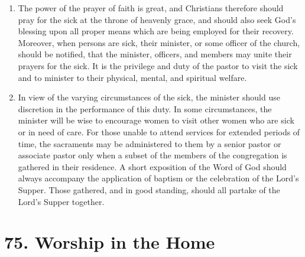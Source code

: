 \documentclass[
]{book}
\providecommand{\tightlist}{%
  \setlength{\itemsep}{0pt}\setlength{\parskip}{0pt}}
\begin{document}
\begin{enumerate}
\def\labelenumi{\arabic{enumi}.}
\tightlist
\item
  \protect\hypertarget{74}{\href{}{}}The power of the prayer of faith is great, and Christians therefore should pray for the sick at the throne of heavenly grace, and should also seek God's blessing upon all proper means which are being employed for their recovery. Moreover, when persons are sick, their minister, or some officer of the church, should be notified, that the minister, officers, and members may unite their prayers for the sick. It is the privilege and duty of the pastor to visit the sick and to minister to their physical, mental, and spiritual welfare.
\item
  In view of the varying circumstances of the sick, the minister should use discretion in the performance of this duty. In some circumstances, the minister will be wise to encourage women to visit other women who are sick or in need of care. For those unable to attend services for extended periods of time, the sacraments may be administered to them by a senior pastor or associate pastor only when a subset of the members of the congregation is gathered in their residence. A short exposition of the Word of God should always accompany the application of baptism or the celebration of the Lord's Supper. Those gathered, and in good standing, should all partake of the Lord's Supper together.
\end{enumerate}

\hypertarget{worship-in-the-home}{%
\section*{75. Worship in the Home}\label{worship-in-the-home}}

\protect\hypertarget{chapter-slug-75-worship-in-the-home}{\href{}{}}
\end{document}
